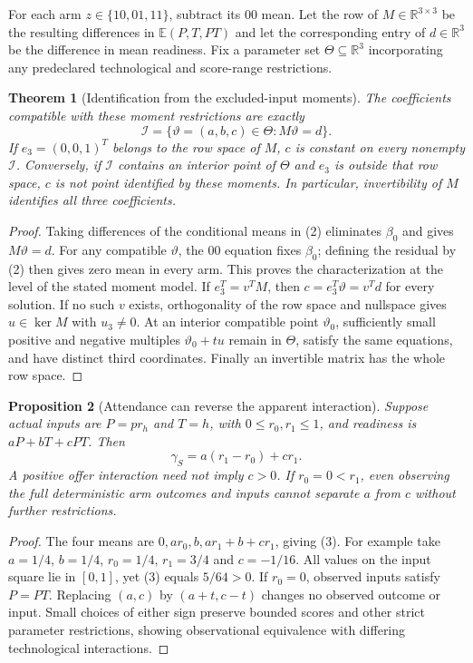 \documentclass[11pt]{article}
\newtheorem{theorem}{Theorem}
\newtheorem{proposition}[theorem]{Proposition}
\theoremstyle{remark}\newtheorem{remark}[theorem]{Remark}
\newcommand{\E}{\mathbb E}
\newcommand{\R}{\mathbb R}
\begin{document}
For each arm $z\in\{10,01,11\}$, subtract its $00$ mean. Let the row of $M\in\R^{3\times3}$ be the resulting differences in $\E(P,T,PT)$ and let the corresponding entry of $d\in\R^3$ be the difference in mean readiness. Fix a parameter set $\Theta\subseteq\R^3$ incorporating any predeclared technological and score-range restrictions.

\begin{theorem}[Identification from the excluded-input moments]
The coefficients compatible with these moment restrictions are exactly
\[
 \mathcal I=\{\vartheta=(a,b,c)\in\Theta:M\vartheta=d\}.
\]
If $e_3=(0,0,1)^T$ belongs to the row space of $M$, $c$ is constant on every nonempty $\mathcal I$. Conversely, if $\mathcal I$ contains an interior point of $\Theta$ and $e_3$ is outside that row space, $c$ is not point identified by these moments. In particular, invertibility of $M$ identifies all three coefficients.
\end{theorem}
\begin{proof}
Taking differences of the conditional means in (2) eliminates $\beta_0$ and gives $M\vartheta=d$. For any compatible $\vartheta$, the $00$ equation fixes $\beta_0$; defining the residual by (2) then gives zero mean in every arm. This proves the characterization at the level of the stated moment model. If $e_3^T=v^TM$, then $c=e_3^T\vartheta=v^Td$ for every solution. If no such $v$ exists, orthogonality of the row space and nullspace gives $u\in\ker M$ with $u_3\ne0$. At an interior compatible point $\vartheta_0$, sufficiently small positive and negative multiples $\vartheta_0+tu$ remain in $\Theta$, satisfy the same equations, and have distinct third coordinates. Finally an invertible matrix has the whole row space.
\end{proof}

\begin{proposition}[Attendance can reverse the apparent interaction]
Suppose actual inputs are $P=p r_h$ and $T=h$, with $0\le r_0,r_1\le1$, and readiness is $aP+bT+cPT$. Then
\[
 \gamma_S=a(r_1-r_0)+cr_1.
 \tag{3}
\]
A positive offer interaction need not imply $c>0$. If $r_0=0<r_1$, even observing the full deterministic arm outcomes and inputs cannot separate $a$ from $c$ without further restrictions.
\end{proposition}
\begin{proof}
The four means are $0,ar_0,b,ar_1+b+cr_1$, giving (3). For example take $a=1/4$, $b=1/4$, $r_0=1/4$, $r_1=3/4$ and $c=-1/16$. All values on the input square lie in $[0,1]$, yet (3) equals $5/64>0$. If $r_0=0$, observed inputs satisfy $P=PT$. Replacing $(a,c)$ by $(a+t,c-t)$ changes no observed outcome or input. Small choices of either sign preserve bounded scores and other strict parameter restrictions, showing observational equivalence with differing technological interactions.
\end{proof}
\end{document}
